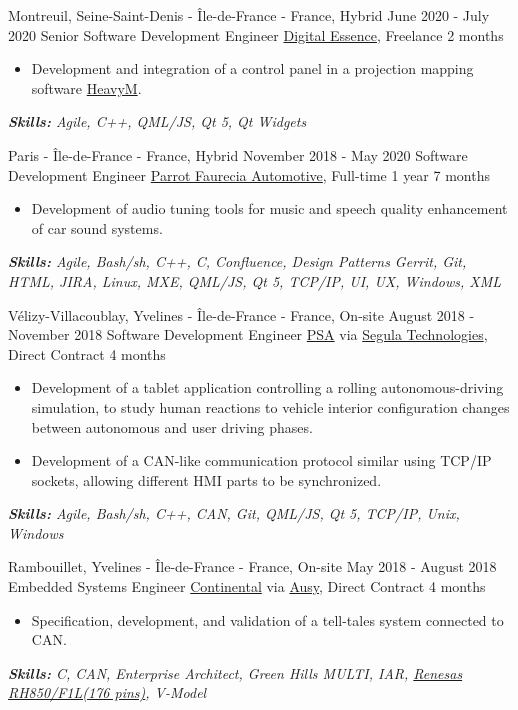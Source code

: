 \documentclass[11pt,a4paper,roman]{moderncv}
\begin{document}
\cventry
{Montreuil, Seine-Saint-Denis - Île-de-France - France, Hybrid}
{June 2020 - July 2020}
{Senior Software Development Engineer}
{\href{https://digitalessence.fr/en/}{Digital Essence}, Freelance}
{2 months}
{}
{
\begin{itemize}
\item Development and integration of a control panel in a projection mapping software \href{https://www.heavym.net}{HeavyM}.
\end{itemize}
{\textcolor{color2}{\textit{\textbf{Skills:}
	Agile,
	C++,
	QML/JS,
	Qt 5,
	Qt Widgets
	\newline
}}}}


\cventry
{Paris - Île-de-France - France, Hybrid}
{November 2018 - May 2020}
{Software Development Engineer}
{\href{https://www.faurecia-clarion.com}{Parrot Faurecia Automotive}, Full-time}
{1 year 7 months}
{}
{
\begin{itemize}
\item Development of audio tuning tools for music and speech quality enhancement of car sound systems.
\end{itemize}
{\textcolor{color2}{\textit{\textbf{Skills:}
	Agile,
	Bash/sh,
	C++,
	C,
	Confluence,
	Design Patterns
	Gerrit,
	Git,
	HTML,
	JIRA,
	Linux,
	MXE,
	QML/JS,
	Qt 5,
	TCP/IP,
	UI,
	UX,
	Windows,
	XML
	\newline
}}}}

\cventry
{Vélizy-Villacoublay, Yvelines - Île-de-France - France, On-site}
{August 2018 - November 2018}
{Software Development Engineer}
{\href{https://www.groupe-psa.com/en/}{PSA} via \href{https://www.segulatechnologies.com/en/}{Segula Technologies}, Direct Contract}
{4 months}
{}
{
\begin{itemize}
	\item Development of a tablet application controlling a rolling autonomous-driving simulation, to study human reactions to vehicle interior configuration changes between autonomous and user driving phases.
	\item Development of a CAN-like communication protocol similar using TCP/IP sockets, allowing different HMI parts to be synchronized.
\end{itemize}
{\textcolor{color2}{\textit{\textbf{Skills:}
	Agile,
	Bash/sh,
	C++,
	CAN,
	Git,
	QML/JS,
	Qt 5,
	TCP/IP,
	Unix,
	Windows
	\newline
}}}}


\cventry
{Rambouillet, Yvelines - Île-de-France - France, On-site}
{May 2018 - August 2018}
{Embedded Systems Engineer}
{\href{https://www.continental.com/en}{Continental} via \href{https://www.ausy.com/en}{Ausy}, Direct Contract}
{4 months}
{}
{
\begin{itemize}
	\item Specification, development, and validation of a tell-tales system connected to CAN.
\end{itemize}
{\textcolor{color2}{\textit{\textbf{Skills:}
	C,
	CAN,
	Enterprise Architect,
	Green Hills MULTI,
	IAR,
	\href{https://www.renesas.com/eu/en/products/microcontrollers-microprocessors/rh850/rh850f1x/rh850f1l.html}{Renesas RH850/F1L(176 pins)},
	V-Model
	\newline
}}}}
\end{document}
